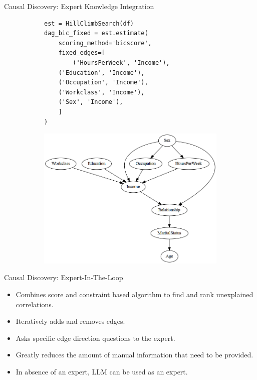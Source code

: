 \documentclass[aspectratio=169]{beamer}
\begin{document}
\begin{frame}[fragile]{Causal Discovery: Expert Knowledge Integration}
	\begin{figure}
		\begin{subfigure}{0.5 \textwidth}
			\begin{verbatim}
est = HillClimbSearch(df)
dag_bic_fixed = est.estimate(
    scoring_method='bicscore',
    fixed_edges=[
        ('HoursPerWeek', 'Income'),
	('Education', 'Income'),
	('Occupation', 'Income'),
	('Workclass', 'Income'),
	('Sex', 'Income'),
	]
)
			\end{verbatim}
		\end{subfigure}%
		\begin{subfigure}{0.5 \textwidth}
			\centering
			\includegraphics[scale=0.3]{imgs/adult_bic_fixed.png}
		\end{subfigure}
	\end{figure}
\end{frame}

\begin{frame}{Causal Discovery: Expert-In-The-Loop}

	\vspace{2em}

	\begin{itemize}
		\item Combines score and constraint based algorithm to find and
			rank unexplained correlations.
		\item Iteratively adds and removes edges.
		\item Asks specific edge direction questions to the expert.
		\item Greatly reduces the amount of manual information that need to be provided.
		\item In absence of an expert, LLM can be used as an expert.
	\end{itemize}
\end{frame}
\end{document}
